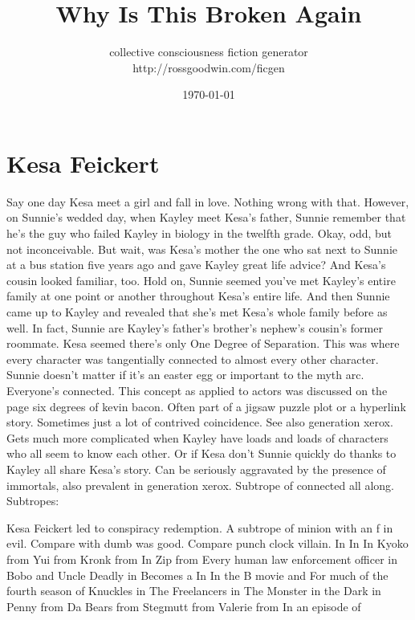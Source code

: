 \documentclass[12pt]{book}
\title{Why Is This Broken Again}
\author{collective consciousness fiction generator\\http://rossgoodwin.com/ficgen}
\date{\today}
\begin{document}
\maketitle



\chapter{Kesa Feickert}

Say one day Kesa meet a girl and fall in love. Nothing wrong with that. However, on Sunnie's wedded day, when Kayley meet Kesa's father, Sunnie remember that he's the guy who failed Kayley in biology in the twelfth grade. Okay, odd, but not inconceivable. But wait, was Kesa's mother the one who sat next to Sunnie at a bus station five years ago and gave Kayley great life advice? And Kesa's cousin looked familiar, too. Hold on, Sunnie seemed you've met Kayley's entire family at one point or another throughout Kesa's entire life. And then Sunnie came up to Kayley and revealed that she's met Kesa's whole family before as well. In fact, Sunnie are Kayley's father's brother's nephew's cousin's former roommate. Kesa seemed there's only One Degree of Separation. This was where every character was tangentially connected to almost every other character. Sunnie doesn't matter if it's an easter egg or important to the myth arc. Everyone's connected. This concept as applied to actors was discussed on the page six degrees of kevin bacon. Often part of a jigsaw puzzle plot or a hyperlink story. Sometimes just a lot of contrived coincidence. See also generation xerox. Gets much more complicated when Kayley have loads and loads of characters who all seem to know each other. Or if Kesa don't Sunnie quickly do thanks to Kayley all share Kesa's story. Can be seriously aggravated by the presence of immortals, also prevalent in generation xerox. Subtrope of connected all along. Subtropes:



Kesa Feickert led to conspiracy redemption. A subtrope of minion with an f in evil. Compare with dumb was good. Compare punch clock villain. In In In Kyoko from Yui from Kronk from In Zip from Every human law enforcement officer in Bobo and Uncle Deadly in Becomes a In In the B movie and For much of the fourth season of Knuckles in The Freelancers in The Monster in the Dark in Penny from Da Bears from Stegmutt from Valerie from In an episode of
\end{document}
